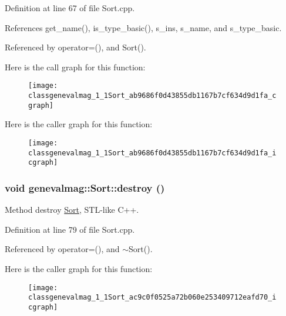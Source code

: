 Definition at line 67 of file Sort.cpp.



References get\_\-name(), is\_\-type\_\-basic(), s\_\-ins, s\_\-name, and s\_\-type\_\-basic.



Referenced by operator=(), and Sort().



Here is the call graph for this function:\nopagebreak
\begin{figure}[H]
\begin{center}
\leavevmode
\texttt{[image: classgenevalmag\_1\_1Sort\_ab9686f0d43855db1167b7cf634d9d1fa\_cgraph]}
\end{center}
\end{figure}




Here is the caller graph for this function:\nopagebreak
\begin{figure}[H]
\begin{center}
\leavevmode
\texttt{[image: classgenevalmag\_1\_1Sort\_ab9686f0d43855db1167b7cf634d9d1fa\_icgraph]}
\end{center}
\end{figure}


\hypertarget{classgenevalmag_1_1Sort_ac9c0f0525a72b060e253409712eafd70}{
\subsubsection[{destroy}]{\setlength{\rightskip}{0pt plus 5cm}void genevalmag::Sort::destroy ()}}
\label{classgenevalmag_1_1Sort_ac9c0f0525a72b060e253409712eafd70}
Method destroy \hyperlink{classgenevalmag_1_1Sort}{Sort}, STL-\/like C++. 

Definition at line 79 of file Sort.cpp.



Referenced by operator=(), and $\sim$Sort().



Here is the caller graph for this function:\nopagebreak
\begin{figure}[H]
\begin{center}
\leavevmode
\texttt{[image: classgenevalmag\_1\_1Sort\_ac9c0f0525a72b060e253409712eafd70\_icgraph]}
\end{center}
\end{figure}


